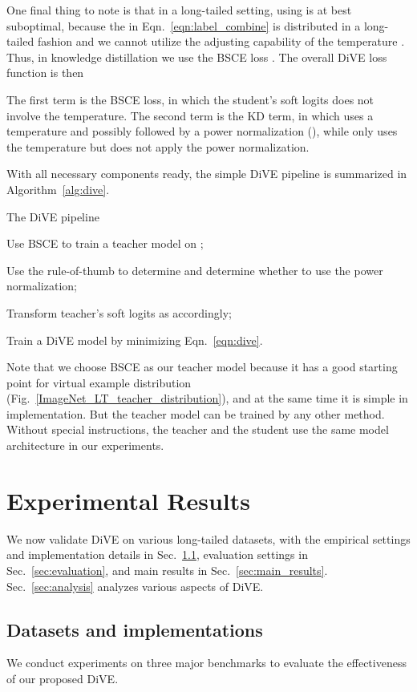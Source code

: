 \documentclass[10pt,twocolumn,letterpaper]{article}
\begin{document}
One final thing to note is that in a long-tailed setting, using  is at best suboptimal, because the  in Eqn.~\eqref{eqn:label_combine} is distributed in a long-tailed fashion and we cannot utilize the adjusting capability of the temperature . Thus, in knowledge distillation we use the BSCE loss . The overall DiVE loss function is then

The first term is the BSCE loss, in which the student’s soft logits  does not involve the temperature. The second term is the KD term, in which  uses a temperature  and possibly followed by a power normalization (), while  only uses the temperature  but does not apply the power normalization.

With all necessary components ready, the simple DiVE pipeline is summarized in Algorithm~\ref{alg:dive}.

\begin{algorithm}
	\caption{The DiVE pipeline}
	\label{alg:dive}
	\SetAlgoLined
		Use BSCE to train a teacher model on ;\par
		Use the rule-of-thumb to determine  and determine whether to use the power normalization;\par
		Transform teacher’s soft logits as  accordingly;\par
		Train a DiVE model by minimizing Eqn.~\eqref{eqn:dive}.
\end{algorithm}

Note that we choose BSCE as our teacher model because it has a good starting point for virtual example distribution (\cf Fig.~\ref{ImageNet_LT_teacher_distribution}), and at the same time it is simple in implementation. But the teacher model can be trained by any other method. Without special instructions, the teacher and the student use the same model architecture in our experiments.

\section{Experimental Results}\label{sec:results}

We now validate DiVE on various long-tailed datasets, with the empirical settings and implementation details in Sec.~\ref{sec:dataset_and_exp_details}, evaluation settings in Sec.~\ref{sec:evaluation}, and main results in Sec.~\ref{sec:main_results}. Sec.~\ref{sec:analysis} analyzes various aspects of DiVE.

\subsection{Datasets and implementations}\label{sec:dataset_and_exp_details}
We conduct experiments on three major benchmarks to evaluate the effectiveness of our proposed DiVE.
\end{document}
